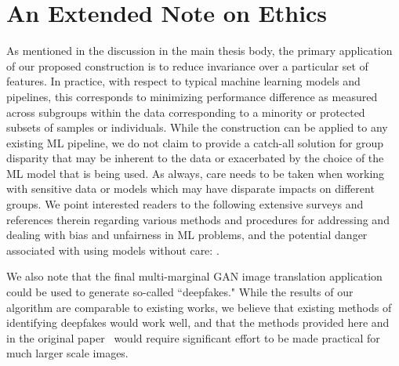 \section{An Extended Note on Ethics}

As mentioned in the discussion in the main thesis body,
the primary application of our proposed construction is to reduce invariance over a particular set of features. In practice, with respect to typical machine learning models and pipelines, 
this corresponds to minimizing performance difference as measured across subgroups within the data corresponding to a minority or protected subsets of samples or individuals.
While the construction can be applied to 
any existing ML pipeline,
we do not claim to provide a catch-all solution for group disparity that may be inherent to the data or exacerbated by the choice of the ML model that is being used.
As always, care needs to be taken when working with sensitive data or models which may have disparate impacts on different groups.
We point interested readers to the following extensive surveys and references therein regarding various methods and procedures for addressing and dealing with bias and unfairness in ML problems, and the potential danger associated with using models without care: \citep{mehrabi2021survey,leavy2018gender,o2016weapons,d2017conscientious,rakova2021responsible}.

We also note that the final multi-marginal GAN image translation application could be used to generate so-called ``deepfakes." 
While the results of our algorithm are comparable to existing works, we believe that existing methods of identifying deepfakes would work well, and that the methods provided here and in the original paper~\citep{cao2019multi} would require significant effort to be made practical for much larger scale images.